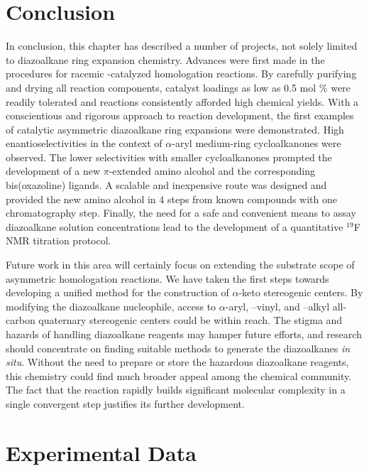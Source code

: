 \pagebreak
\section{Conclusion}

In conclusion, this chapter has described a number of projects, not solely limited to
diazoalkane ring expansion chemistry. Advances were first made in the procedures for racemic
-catalyzed homologation reactions. By carefully purifying and drying all reaction
components, catalyst loadings as low as 0.5 mol \% were readily tolerated and reactions
consistently afforded high chemical yields. With a conscientious and rigorous approach to reaction
development, the first examples of catalytic asymmetric diazoalkane ring expansions were
demonstrated. High enantioselectivities in the context of $\alpha$-aryl medium-ring cycloalkanones
were observed. The lower selectivities with smaller cycloalkanones prompted the development of a
new $\pi$-extended amino alcohol and the corresponding bis(oxazoline) ligands. A scalable and
inexpensive route was designed and provided the new amino alcohol in 4 steps from known compounds
with one chromatography step.
Finally, the need for a safe and convenient means to assay diazoalkane solution concentrations lead to the development of a quantitative $^{19}$F NMR titration protocol.

Future work in this area will certainly focus on extending the substrate scope of asymmetric
homologation reactions. We have taken the first steps towards developing a unified method for the
construction of $\alpha$-keto stereogenic centers. By modifying the diazoalkane nucleophile, access
to $\alpha$-aryl, --vinyl, and --alkyl all-carbon quaternary stereogenic centers could be within
reach. The stigma and hazards of handling diazoalkane reagents may hamper future efforts, and
research should concentrate on finding suitable methods to generate the diazoalkanes \textit{in situ}. Without the
need to prepare or store the hazardous diazoalkane reagents, this chemistry could find much broader
appeal among the chemical community. The fact that the reaction rapidly builds significant molecular
complexity in a single convergent step justifies its further development. 

\pagebreak
\section{Experimental Data}

